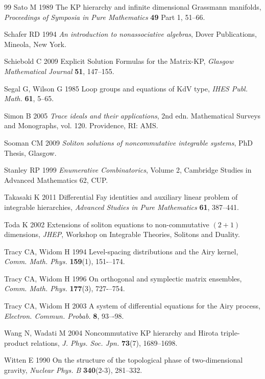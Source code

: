 \documentclass[5p,twocolumn]{elsarticle}
\begin{document}
\begin{thebibliography}{99}
 Sato M 1989 The KP hierarchy and infinite dimensional Grassmann manifolds, \textit{Proceedings of Symposia in Pure Mathematics} \textbf{49} Part 1, 51--66.

 Schafer RD 1994 \textit{An introduction to nonassociative algebras}, Dover Publications, Mineola, New York.
  
 Schiebold C 2009 Explicit Solution Formulas for the Matrix-KP, \textit{Glasgow Mathematical Journal} \textbf{51}, 147--155.
  
 Segal G, Wilson G 1985 Loop groups and equations of KdV type, \textit{IHES Publ. Math.\/} \textbf{61}, 5--65.  

 Simon B 2005 \emph{Trace ideals and their applications}, 2nd edn. Mathematical Surveys and Monographs, vol. 120. Providence, RI: AMS.

 Sooman CM 2009 \textit{Soliton solutions of noncommutative integrable systems}, PhD Thesis, Glasgow.

 Stanley RP 1999 \textit{Enumerative Combinatorics}, Volume 2, Cambridge Studies in Advanced Mathematics 62, CUP.

 Takasaki K 2011 Differential Fay identities and auxiliary linear problem of integrable hierarchies, \textit{Advanced Studies in Pure Mathematics} \textbf{61}, 387--441.
  
 Toda K 2002 Extensions of soliton equations to non-commutative $(2+1)$ dimensions, \textit{JHEP}, Workshop on Integrable Theories, Solitons and Duality.

 Tracy CA, Widom H 1994 Level-spacing distributions and the Airy kernel, \textit{Comm. Math. Phys.\/} \textbf{159}(1), 151-–174.

 Tracy CA, Widom H 1996 On orthogonal and symplectic matrix ensembles, \textit{Comm. Math. Phys.\/} \textbf{177}(3), 727-–754.

 Tracy CA, Widom H 2003 A system of differential equations for the Airy process, \textit{Electron. Commun. Probab.\/} \textbf{8}, 93–-98.
  
 Wang N, Wadati M 2004 Noncommutative KP hierarchy and Hirota triple-product relations, \textit{J. Phys. Soc. Jpn.\/} \textbf{73}(7), 1689--1698. 

 Witten E 1990 On the structure of the topological phase of two-dimensional gravity, \textit{Nuclear Phys. B} \textbf{340}(2-3), 281--332.


\end{thebibliography}
\end{document}
